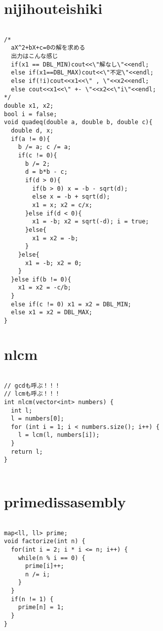 \documentclass[a4j,titlepage]{jarticle} %
\begin{document}
\color{white}
\section{nijihouteishiki}
\color{black}
\begin{lstlisting}[caption=nijihouteishiki]

/*
  aX^2+bX+c=0の解を求める
  出力はこんな感じ
  if(x1 == DBL_MIN)cout<<\"解なし\"<<endl;
  else if(x1==DBL_MAX)cout<<\"不定\"<<endl;
  else if(!i)cout<<x1<<\" , \"<<x2<<endl;
  else cout<<x1<<\" +- \"<<x2<<\"i\"<<endl;
*/
double x1, x2;
bool i = false;
void quadeq(double a, double b, double c){
  double d, x;
  if(a != 0){
    b /= a; c /= a;
    if(c != 0){
      b /= 2;
      d = b*b - c;
      if(d > 0){
        if(b > 0) x = -b - sqrt(d);
        else x = -b + sqrt(d);
        x1 = x; x2 = c/x;
      }else if(d < 0){
        x1 = -b; x2 = sqrt(-d); i = true;
      }else{
        x1 = x2 = -b;
      }
    }else{
      x1 = -b; x2 = 0;
    }
  }else if(b != 0){
    x1 = x2 = -c/b;
  }
  else if(c != 0) x1 = x2 = DBL_MIN;
  else x1 = x2 = DBL_MAX;
}

\end{lstlisting}

\color{white}
\section{nlcm}
\color{black}
\begin{lstlisting}[caption=nlcm]

// gcdも呼ぶ！！！
// lcmも呼ぶ！！！
int nlcm(vector<int> numbers) {
  int l;
  l = numbers[0];
  for (int i = 1; i < numbers.size(); i++) {
    l = lcm(l, numbers[i]);
  }
  return l;
}
 

\end{lstlisting}

\color{white}
\section{primedissasembly}
\color{black}
\begin{lstlisting}[caption=primedissasembly]

map<ll, ll> prime;
void factorize(int n) {
  for(int i = 2; i * i <= n; i++) {
    while(n % i == 0) {
      prime[i]++;
      n /= i;
    }
  }
  if(n != 1) {
    prime[n] = 1;
  }
}

\end{lstlisting}

\color{white}
\end{document}
